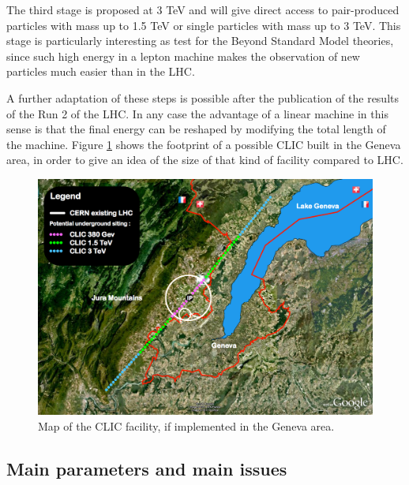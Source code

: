 The third stage is proposed at 3 TeV and will give direct access to pair-produced particles with mass up to 1.5 TeV or single particles with mass up to 3 TeV. This stage is particularly interesting as test for the Beyond Standard Model theories, since such high energy in a lepton machine makes the observation of new particles much easier than in the LHC.

A further adaptation of these steps is possible after the publication of the results of the Run 2 of the LHC. In any case the advantage of a linear machine in this sense is that the final energy can be reshaped by modifying the total length of the machine. Figure \ref{CLIC_map} shows the footprint of a possible CLIC built in the Geneva area, in order to give an idea of the size of that kind of facility compared to LHC.

\begin{figure}[h]
\centering

\includegraphics[scale=0.3]{pictures/CLIC_map}
\caption{Map of the CLIC facility, if implemented in the Geneva area.}
\label{CLIC_map}

\end{figure}


\subsection{Main parameters and main issues}

